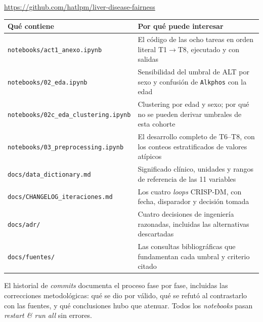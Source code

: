 \documentclass[10pt,a4paper]{article}
\begin{document}
\vspace{-0.2em}
\begin{center}
\large \url{https://github.com/hatlpm/liver-disease-fairness}
\end{center}
\vspace{-0.2em}

\footnotesize
\begin{tabularx}{\textwidth}{@{}l X@{}}
\toprule
\textbf{Qué contiene} & \textbf{Por qué puede interesar} \\
\midrule
\texttt{notebooks/act1\_anexo.ipynb} & El código de las ocho tareas en orden literal T1$\rightarrow$T8, ejecutado y con salidas \\
\texttt{notebooks/02\_eda.ipynb} & Sensibilidad del umbral de ALT por sexo y confusión de \texttt{Alkphos} con la edad \\
\texttt{notebooks/02c\_eda\_clustering.ipynb} & Clustering por edad y sexo; por qué no se pueden derivar umbrales de esta cohorte \\
\texttt{notebooks/03\_preprocessing.ipynb} & El desarrollo completo de T6--T8, con los conteos estratificados de valores atípicos \\
\texttt{docs/data\_dictionary.md} & Significado clínico, unidades y rangos de referencia de las 11 variables \\
\texttt{docs/CHANGELOG\_iteraciones.md} & Los cuatro \textit{loops} CRISP-DM, con fecha, disparador y decisión tomada \\
\texttt{docs/adr/} & Cuatro decisiones de ingeniería razonadas, incluidas las alternativas descartadas \\
\texttt{docs/fuentes/} & Las consultas bibliográficas que fundamentan cada umbral y criterio citado \\
\bottomrule
\end{tabularx}

\vspace{0.3em}
\normalsize
El historial de \textit{commits} documenta el proceso fase por fase, incluidas
las correcciones metodológicas: qué se dio por válido, qué se refutó al
contrastarlo con las fuentes, y qué conclusiones hubo que atenuar. Todos los
\textit{notebooks} pasan \textit{restart \& run all} sin errores.
\end{document}
